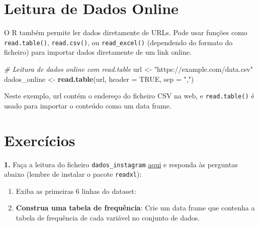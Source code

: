 \documentclass[
]{book}
\newenvironment{Shaded}{\begin{snugshade}}{\end{snugshade}}
\newcommand{\AttributeTok}[1]{\textcolor[rgb]{0.13,0.29,0.53}{#1}}
\newcommand{\CommentTok}[1]{\textcolor[rgb]{0.56,0.35,0.01}{\textit{#1}}}
\newcommand{\ConstantTok}[1]{\textcolor[rgb]{0.56,0.35,0.01}{#1}}
\newcommand{\FunctionTok}[1]{\textcolor[rgb]{0.13,0.29,0.53}{\textbf{#1}}}
\newcommand{\NormalTok}[1]{#1}
\newcommand{\OtherTok}[1]{\textcolor[rgb]{0.56,0.35,0.01}{#1}}
\newcommand{\StringTok}[1]{\textcolor[rgb]{0.31,0.60,0.02}{#1}}
\begin{document}
\section{Leitura de Dados Online}\label{leitura-de-dados-online}

O R também permite ler dados diretamente de URLs. Pode usar funções como
\texttt{read.table()}, \texttt{read.csv()}, ou \texttt{read\_excel()} (dependendo do formato
do ficheiro) para importar dados diretamente de um link online.

\begin{Shaded}
\begin{Highlighting}[]
\CommentTok{\# Leitura de dados online com read.table}
\NormalTok{url }\OtherTok{\textless{}{-}} \StringTok{"https://example.com/data.csv"}
\NormalTok{dados\_online }\OtherTok{\textless{}{-}} \FunctionTok{read.table}\NormalTok{(url, }\AttributeTok{header =} \ConstantTok{TRUE}\NormalTok{, }\AttributeTok{sep =} \StringTok{","}\NormalTok{)}
\end{Highlighting}
\end{Shaded}

Neste exemplo, url contém o endereço do ficheiro CSV na web, e
\texttt{read.table()} é usado para importar o conteúdo como um data frame.

\section{Exercícios}\label{exercuxedcios-9}

\textbf{1.} Faça a leitura do ficheiro \texttt{dados\_instagram} \href{https://renatorpaula.wixsite.com/renato/laboratorio-estatistica}{aqui} e responda às perguntas abaixo (lembre de instalar o pacote \texttt{readxl}):

\begin{enumerate}
\def\labelenumi{(\alph{enumi})}
\item
  Exiba as primeiras 6 linhas do dataset:
\item
  \textbf{Construa uma tabela de frequência}: Crie um data frame que contenha a tabela de frequência de cada variável no conjunto de dados.
\end{enumerate}
\end{document}
